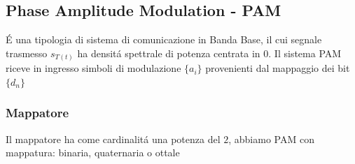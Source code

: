     \subsection{Phase Amplitude Modulation - PAM}
        É una tipologia di sistema di comunicazione in {\color{blue}Banda Base}, il cui segnale trasmesso $s_{T(t)}$ ha densitá spettrale
        di potenza centrata in $0$. Il sistema PAM riceve in ingresso simboli di modulazione $\{a_i\}$ provenienti dal mappaggio dei bit $\{d_n\}$ 
        \subsubsection{Mappatore}
            Il mappatore ha come cardinalitá una potenza del $2$, abbiamo PAM con mappatura: binaria, quaternaria o ottale
            \begin{table}[H]
                \centering
                \hfill
                \hfill
            \end{table}
